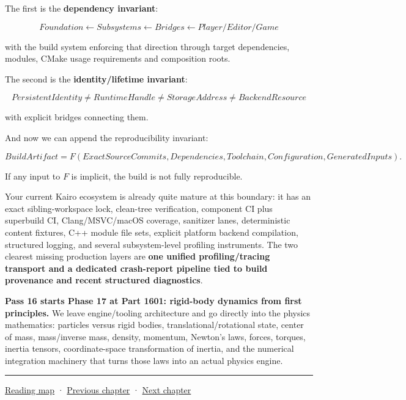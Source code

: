 The first is the \textbf{dependency invariant}:

\[
\boxed{
Foundation
\leftarrow
Subsystems
\leftarrow
Bridges
\leftarrow
Player/Editor/Game
}
\]

with the build system enforcing that direction through target dependencies, modules, CMake usage requirements and composition roots.

The second is the \textbf{identity/lifetime invariant}:

\[
\boxed{
PersistentIdentity
\neq
RuntimeHandle
\neq
StorageAddress
\neq
BackendResource
}
\]

with explicit bridges connecting them.

And now we can append the reproducibility invariant:

\[
\boxed{
BuildArtifact
=
F(
ExactSourceCommits,
Dependencies,
Toolchain,
Configuration,
GeneratedInputs
).
}
\]

If any input to \(F\) is implicit, the build is not fully reproducible.

Your current Kairo ecosystem is already quite mature at this boundary: it has an exact sibling-workspace lock, clean-tree verification, component CI plus superbuild CI, Clang/MSVC/macOS coverage, sanitizer lanes, deterministic content fixtures, C++ module file sets, explicit platform backend compilation, structured logging, and several subsystem-level profiling instruments. The two clearest missing production layers are \textbf{one unified profiling/tracing transport and a dedicated crash-report pipeline tied to build provenance and recent structured diagnostics}.

\textbf{Pass 16 starts Phase 17 at Part 1601: rigid-body dynamics from first principles.} We leave engine/tooling architecture and go directly into the physics mathematics: particles versus rigid bodies, translational/rotational state, center of mass, mass/inverse mass, density, momentum, Newton's laws, forces, torques, inertia tensors, coordinate-space transformation of inertia, and the numerical integration machinery that turns those laws into an actual physics engine.

\begin{center}\rule{0.5\linewidth}{0.5pt}\end{center}

\hyperref[volume-reading-map]{Reading map} · \hyperref[03-visual-computing-i-ch016-gpu-memory-divergence-and-execution-order]{Previous chapter} · \hyperref[03-visual-computing-i-ch018-c-representation-ownership-and-lifetime]{Next chapter}
